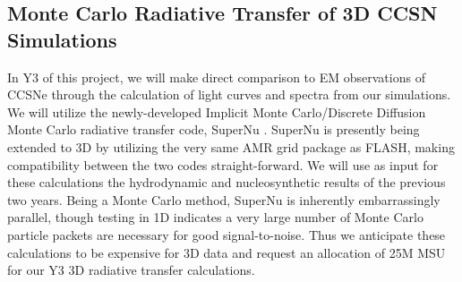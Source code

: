 \subsection{Monte Carlo Radiative Transfer of 3D CCSN Simulations}
\label{sec:radtrans}


In Y3 of this project, we will make direct comparison to EM observations of CCSNe through the calculation of light curves and spectra from our simulations.
We will utilize the newly-developed Implicit Monte Carlo/Discrete Diffusion Monte Carlo radiative transfer code, SuperNu \citep{Wollaeger:2013ix}.
SuperNu is presently being extended to 3D by utilizing the very same AMR grid package as FLASH, making compatibility between the two codes straight-forward.
We will use as input for these calculations the hydrodynamic and nucleosynthetic results of the previous two years.
Being a Monte Carlo method, SuperNu is inherently embarrassingly parallel, though testing in 1D indicates a very large number of Monte Carlo particle packets are necessary for good signal-to-noise.
Thus we anticipate these calculations to be expensive for 3D data and request an allocation of 25M MSU for our Y3 3D radiative transfer calculations.


